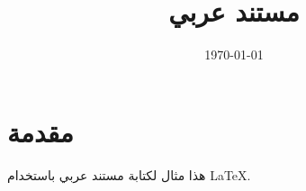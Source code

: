 \documentclass[12pt]{article}
\title{مستند عربي}
\author{}
\date{\today}
\begin{document}
\maketitle
\section{مقدمة}
هذا مثال لكتابة مستند عربي باستخدام \LaTeX.
\end{document}
